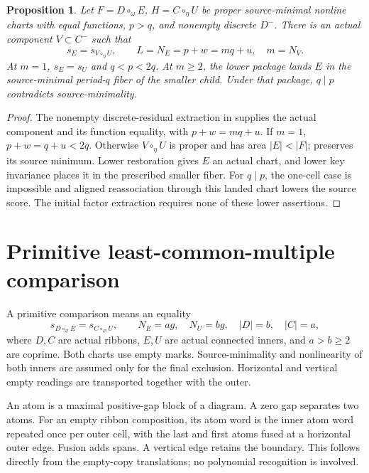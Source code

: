 \documentclass[11pt,a4paper]{amsart}
\numberwithin{equation}{section}
\theoremstyle{plain}
\newtheorem{proposition}[theorem]{Proposition}
\theoremstyle{definition}
\begin{document}
\begin{proposition}\label{prop:beta-reduction}
Let \(F=D\circ_\omega E\), \(H=C\circ_\eta U\) be proper source-minimal nonline charts with equal functions, \(p>q\), and nonempty discrete \(D^-\).  There is an actual component \(V\subset C^-\) such that
\[
 s_E=s_{V\circ_\eta U},\qquad L=N_E=p+w=mq+u,\quad m=N_V.
\]
At \(m=1\), \(s_E=s_U\) and \(q<p<2q\).  At \(m\ge2\), the lower package lands \(E\) in the source-minimal period-\(q\) fiber of the smaller child.  Under that package, \(q\mid p\) contradicts source-minimality.
\end{proposition}
\begin{proof}
The nonempty discrete-residual extraction in \cite{Shields2026CornerDescent} supplies the actual component and its function equality, with \(p+w=mq+u\).  If \(m=1\), \(p+w=q+u<2q\).  Otherwise \(V\circ_\eta U\) is proper and has area \(|E|<|F|\);  preserves its source minimum.  Lower restoration gives \(E\) an actual chart, and lower key invariance places it in the prescribed smaller fiber.  For \(q\mid p\), the one-cell case is impossible and aligned reassociation through this landed chart lowers the source score.  The initial factor extraction requires none of these lower assertions.
\end{proof}

\section{Primitive least-common-multiple comparison}\label{sec:lcm}

A primitive comparison means an equality
\[
 s_{D\circ_\varnothing E}=s_{C\circ_\varnothing U},\qquad
 N_E=ag,\quad N_U=bg,\quad |D|=b,\quad |C|=a,
\]
where \(D,C\) are actual ribbons, \(E,U\) are actual connected inners, and \(a>b\ge2\) are coprime.  Both charts use empty marks.  Source-minimality and nonlinearity of both inners are assumed only for the final exclusion.  Horizontal and vertical empty readings are transported together with the outer.

An atom is a maximal positive-gap block of a diagram.  A zero gap separates two atoms.  For an empty ribbon composition, its atom word is the inner atom word repeated once per outer cell, with the last and first atoms fused at a horizontal outer edge.  Fusion adds spans.  A vertical edge retains the boundary.  This follows directly from the empty-copy translations; no polynomial recognition is involved.
\end{document}
